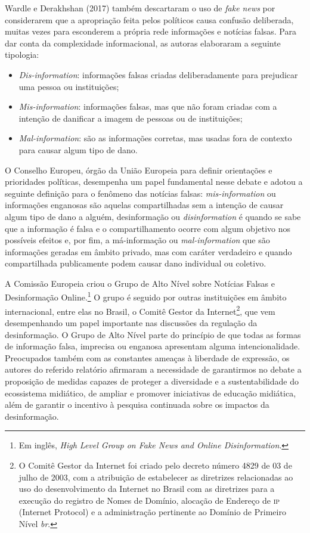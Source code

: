 Wardle e Derakhshan (2017) também descartaram o uso de \textit{fake news}
por considerarem que a apropriação feita pelos políticos causa confusão
deliberada, muitas vezes para esconderem a própria rede informações e
notícias falsas. Para dar conta da complexidade informacional, as
autoras elaboraram a seguinte tipologia:

\begin{itemize}
\item \textit{Dis-information}: informações falsas criadas deliberadamente para
prejudicar uma pessoa ou instituições;

\item \textit{Mis-information}: informações falsas, mas que não foram criadas
com a intenção de danificar a imagem de pessoas ou de instituições;

\item \textit{Mal-information}: são as informações corretas, mas usadas fora de
contexto para causar algum tipo de dano.
\end{itemize}

O Conselho Europeu, órgão da União Europeia para definir orientações e
prioridades políticas, desempenha um papel fundamental nesse debate e
adotou a seguinte definição para o fenômeno das notícias falsas:
\textit{mis-information} ou informações enganosas são aquelas
compartilhadas sem a intenção de causar algum tipo de dano a alguém,
desinformação ou \textit{disinformation} é quando se sabe que a informação
é falsa e o compartilhamento ocorre com algum objetivo nos possíveis
efeitos e, por fim, a má-informação ou \textit{mal-information} que são
informações geradas em âmbito privado, mas com caráter verdadeiro e
quando compartilhada publicamente podem causar dano individual ou
coletivo.

A Comissão Europeia criou o Grupo de Alto Nível sobre Notícias Falsas e
Desinformação Online.\footnote{Em inglês, \textit{High Level Group on Fake News and Online
Disinformation}.} O grupo é seguido por outras instituições em âmbito
internacional, entre elas no Brasil, o Comitê Gestor da
Internet\footnote{O Comitê Gestor da Internet foi criado pelo decreto
  número 4829 de 03 de julho de 2003, com a atribuição de estabelecer as diretrizes
  relacionadas ao uso do desenvolvimento da Internet no Brasil com as
  diretrizes para a execução do registro de Nomes de Domínio, alocação
  de Endereço de \textsc{ip} (Internet Protocol) e a administração pertinente ao
  Domínio de Primeiro Nível \textit{br}.}, que vem desempenhando um papel
importante nas discussões da regulação da desinformação. O Grupo de Alto
Nível parte do princípio de que todas as formas de informação falsa,
imprecisa ou enganosa apresentam alguma intencionalidade. Preocupados
também com as constantes ameaças à liberdade de expressão, os autores do
referido relatório afirmaram a necessidade de garantirmos no debate a
proposição de medidas capazes de proteger a diversidade e a
sustentabilidade do ecossistema midiático, de ampliar e promover
iniciativas de educação midiática, além de garantir o incentivo à
pesquisa continuada sobre os impactos da desinformação.

